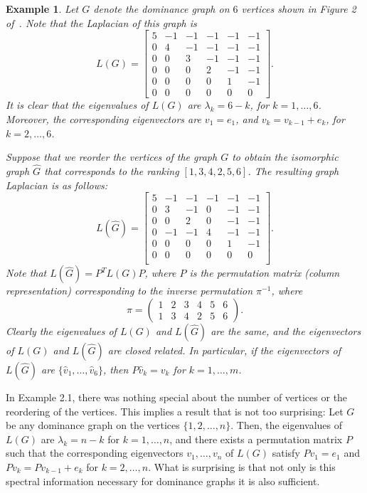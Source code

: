 \documentclass{article}
\newtheorem{example}[theorem]{Example}
\begin{document}
\begin{example}
Let $G$ denote the dominance graph on $6$ vertices shown in Figure 2 of~\cite{Anderson2018}. 
Note that the Laplacian of this graph is 
\[
L(G)=
\begin{bmatrix}
5 & -1 & -1 & -1 & -1 & -1 \\
0 & 4 & -1 & -1 & -1 & -1 \\
0 & 0 & 3 & -1 & -1 & -1 \\
0 & 0 & 0 & 2 & -1 & -1 \\
0 & 0 & 0 & 0 & 1 & -1 \\
0 & 0 & 0 & 0 & 0 & 0
\end{bmatrix}.
\]
It is clear that the eigenvalues of $L(G)$ are $\lambda_{k}=6-k$, for $k=1,\ldots,6$.
Moreover, the corresponding eigenvectors are $v_{1}=e_{1}$, and $v_{k}=v_{k-1}+e_{k}$, for $k=2,\ldots,6$.

Suppose that we reorder the vertices of the graph $G$ to obtain the isomorphic graph $\hat{G}$ that corresponds to the ranking $[1,3,4,2,5,6]$.
The resulting graph Laplacian is as follows:
\[
L(\hat{G})=
\begin{bmatrix}
 5 & -1 & -1 & -1 & -1 & -1 \\
 0 & 3 & -1 & 0 & -1 & -1 \\
 0 & 0 & 2 & 0 & -1 & -1 \\
 0 & -1 & -1 & 4 & -1 & -1 \\
 0 & 0 & 0 & 0 & 1 & -1 \\
 0 & 0 & 0 & 0 & 0 & 0 \\
\end{bmatrix}.
\]
Note that $L(\hat{G})=P^{T}L(G)P$, where $P$ is the permutation matrix (column representation) corresponding to the inverse permutation $\pi^{-1}$, where
\[
\pi=
\left(
\begin{array}{cccccc}
1 & 2 & 3 & 4 & 5 & 6 \\
1 & 3 & 4 & 2 & 5 & 6
\end{array}
\right).
\]
Clearly the eigenvalues of $L(G)$ and $L(\hat{G})$ are the same, and the eigenvectors of $L(G)$ and $L(\hat{G})$ are closed related.
In particular, if the eigenvectors of $L(\hat{G})$ are $\{\hat{v}_{1},\ldots,\hat{v}_{6}\}$, then $P\hat{v}_{k}=v_{k}$ for $k=1,\ldots,m$. 
\end{example}

In Example 2.1, there was nothing special about the number of vertices or the reordering of the vertices. 
This implies a result that is not too surprising: 
Let $G$ be any dominance graph on the vertices $\{1,2,\ldots,n\}$. 
Then, the eigenvalues of $L(G)$ are $\lambda_{k}=n-k$ for $k=1,\ldots,n$, and there exists a permutation matrix $P$ such that
the corresponding eigenvectors $v_{1},\ldots,v_{n}$ of $L(G)$ satisfy $Pv_{1}=e_{1}$ and $Pv_{k}=Pv_{k-1}+e_{k}$ for $k=2,\ldots,n$.
What is surprising is that not only is this spectral information necessary for dominance graphs it is also sufficient. 
\end{document}
